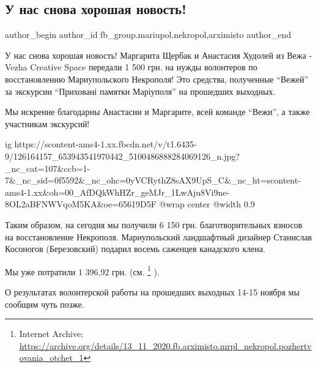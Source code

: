  
 
 
 
 

\subsection{У нас снова хорошая новость!}
\label{sec:18_11_2020.fb.fb_group.mariupol.nekropol.1.u_nas_snova_horoshaja_novost}
 
\ifcmt
 author_begin
   author_id fb_group.mariupol.nekropol,arximisto
 author_end
\fi

У нас снова хорошая новость! Маргарита Щербак и Анастасия Худолей из Вежа -
Vezha Creative Space передали 1 500 грн. на нужды волонтеров по восстановлению
Мариупольского Некрополя! Это средства, полученные \enquote{Вежей} за экскурсии
\enquote{Приховані памятки Маріуполя} на прошедших выходных.

Мы искренне благодарны Анастасии и Маргарите, всей команде \enquote{Вежи}, а
также участникам экскурсий!

\ifcmt
  ig https://scontent-ams4-1.xx.fbcdn.net/v/t1.6435-9/126164157_653943541970442_5100486888284069126_n.jpg?_nc_cat=107&ccb=1-7&_nc_sid=0f5592&_nc_ohc=0yVCRythZ8sAX9UpS_C&_nc_ht=scontent-ams4-1.xx&oh=00_AfDQkWhHZr_geMJr_1LwAju8Vi9ne-8OL2aBFNWVqoM5KA&oe=65619D5F
  @wrap center
  @width 0.9
\fi

Таким образом, на сегодня мы получили 6 150 грн. благотворительных взносов на
восстановление Некрополя. Мариупольский ландшафтный дизайнер Станислав
Косоногов (Березовский) подарил восемь саженцев канадского клена.

Мы уже потратили 1 396,92 грн. (см. \footnote{Internet Archive: \url{https://archive.org/details/13_11_2020.fb.arximisto.mrpl_nekropol.pozhertvovania_otchet_1}} ).

О результатах волонтерской работы на прошедших выходных 14-15 ноября мы сообщим
чуть позже.
